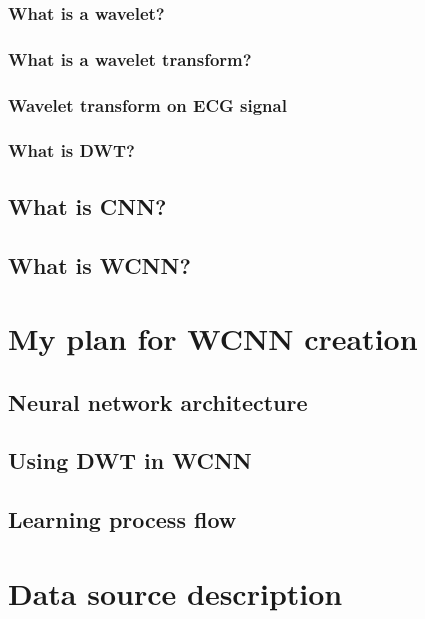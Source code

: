 \documentclass[12pt, a4paper, twoside]{scrartcl}
\begin{document}
\subsubsection{What is a wavelet?}

\subsubsection{What is a wavelet transform?}

\subsubsection{Wavelet transform on \ac{ECG} signal}

\subsubsection{What is \ac{DWT}?}

\subsection{What is \ac{CNN}?}

\subsection{What is \ac{WCNN}?}

\clearpage


\section{My plan for \ac{WCNN} creation} 

\subsection{Neural network architecture}

\subsection{Using \ac{DWT} in \ac{WCNN}}

\subsection{Learning process flow}

\clearpage


\section{Data source description}
\end{document}
